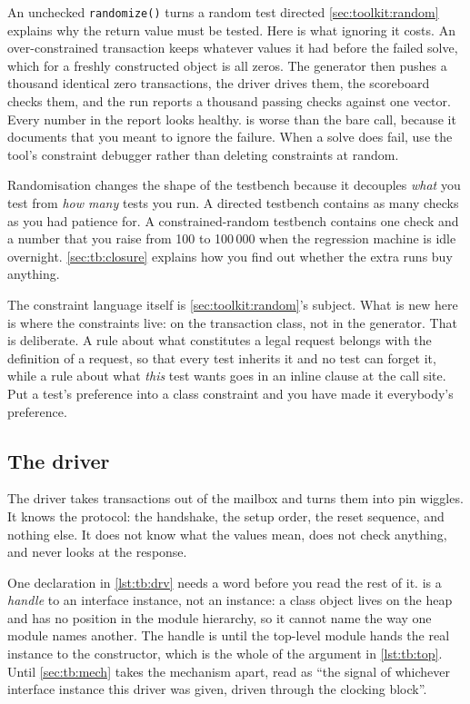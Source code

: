\begin{gotcha}{An unchecked \texttt{randomize()} turns a random test directed}
\cref{sec:toolkit:random} explains why the return value must be tested. Here is what
ignoring it costs. An over-constrained transaction keeps whatever values it
had before the failed solve, which for a freshly constructed object is all
zeros. The generator then pushes a thousand identical zero transactions, the
driver drives them, the scoreboard checks them, and the run reports a thousand
passing checks against one vector. Every number in the report looks healthy.
 is worse than the bare call, because it documents
that you meant to ignore the failure. When a solve does fail, use the tool's
constraint debugger rather than deleting constraints at random.
\end{gotcha}

Randomisation changes the shape of the testbench because it decouples
\emph{what} you test from \emph{how many} tests you run. A directed \VHDL{}
testbench contains as many checks as you had patience for. A
constrained-random testbench contains one check and a number that you raise
from 100 to 100\,000 when the regression machine is idle overnight.
\cref{sec:tb:closure} explains how you find out whether the extra runs buy
anything.

The constraint language itself is \cref{sec:toolkit:random}'s subject. What is new
here is where the constraints live: on the transaction class, not in the
generator. That is deliberate. A rule about what constitutes a legal request
belongs with the definition of a request, so that every test inherits it and no
test can forget it, while a rule about what \emph{this} test wants goes in an
inline  clause at the call site. Put a test's preference
into a class constraint and you have made it everybody's preference.

\subsection{The driver}

The driver takes transactions out of the mailbox and turns them
into pin wiggles. It knows the protocol: the handshake, the setup order, the
reset sequence, and nothing else. It does not know what the values mean, does
not check anything, and never looks at the response.

One declaration in \cref{lst:tb:drv} needs a word
before you read the rest of it.  is a
\emph{handle} to an interface instance, not an instance: a class object lives
on the heap and has no position in the module hierarchy, so it cannot name
 the way one module names another. The handle is
 until the top-level module hands the real instance to the
constructor, which is the whole of the argument  in
\cref{lst:tb:top}. Until \cref{sec:tb:mech} takes the mechanism apart, read
 as ``the  signal of whichever
interface instance this driver was given, driven through the 
clocking block''.

